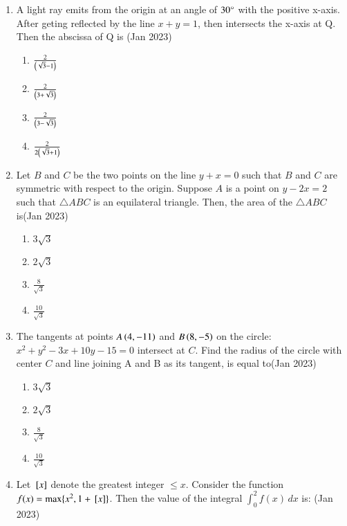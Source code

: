 \documentclass[journal,12pt,onecolumn]{IEEEtran}
\theoremstyle{remark}
\begin{document}
\begin{enumerate}
\item A light ray emits from the origin at an angle of $30\degree$ with the positive x-axis. After geting reflected by the line $x + y = 1$, then intersects the x-axis at Q. Then the abscissa of Q is \hfill(Jan 2023)
\begin{multicols}{2}
\begin{enumerate}
    \item $\frac{2}{\left(\sqrt{3} - 1\right)}$\\
     \item $\frac{2}{\left(3 + \sqrt{3}\right)}$
     \item $\frac{2}{\left(3 - \sqrt{3}\right)}$\\
     \item $\frac{2}{2\left(\sqrt{3} + 1\right)}$
\end{enumerate}
\end{multicols}
\item Let $B$ and $C$ be the two points on the line $y + x = 0$
such that $B$ and $C$ are symmetric with respect to the origin. Suppose $A$ is a point on $y - 2x = 2$ such that $\triangle ABC$ is an equilateral triangle. Then, the area of the $\triangle ABC$ is\hfill(Jan 2023)
\begin{multicols}{4}
\begin{enumerate}
    \item $3\sqrt{3}$
   \item $2\sqrt{3}$
   \item $\frac{8}{\sqrt{3}}$
   \item $\frac{10}{\sqrt{3}}$
\end{enumerate}
\end{multicols}
\item The tangents at points  $A\left(4, -11\right)$ and $B\left(8, -5\right)$ on the circle: $x^2 + y^2 - 3x + 10y - 15 = 0$ intersect at $C$. Find the radius of the circle with center $C$ and line joining A and B as its
tangent, is equal to\hfill(Jan 2023)
\begin{multicols}{4}
\begin{enumerate}
    \item $3\sqrt{3}$
   \item $2\sqrt{3}$
   \item $\frac{8}{\sqrt{3}}$
   \item $\frac{10}{\sqrt{3}}$
\end{enumerate}
\end{multicols}
\item Let ${}\left[x\right]$ denote the greatest integer $\leq x$. Consider the function $f(x) = \max \{x^2, 1 + {}\left[x\right]\}$. Then the value of the integral $\int_0^2 f(x)\,dx$ is: \hfill (Jan 2023)

\end{enumerate}
\end{document}
